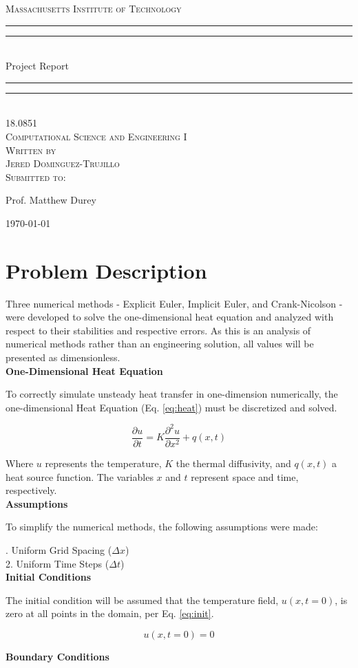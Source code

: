 \documentclass[10pt, letter, showtrims]{extarticle}
\newcommand{\University}{Massachusetts Institute of Technology}
\newcommand{\ClassCode}{18.0851}
\newcommand{\ClassTitle}{Computational Science and Engineering I}
\newcommand{\Title}{Project Report}
\newcommand{\FirstName}{Jered}
\newcommand{\LastName}{Dominguez-Trujillo}
\newcommand{\ProfTitle}{Prof.}
\newcommand{\ProfFirst}{Matthew}
\newcommand{\ProfLast}{Durey}
\newcommand*{\titleGP}{\begingroup %
\centering %

\textsc{\LARGE \University{}} \\[2\baselineskip] %

\rule{\textwidth}{1.6pt}\vspace*{-\baselineskip}\vspace*{2pt} %
\rule{\textwidth}{0.4pt}\\[\baselineskip] %

{\LARGE \Title{}}\\[0.2\baselineskip] %

\rule{\textwidth}{0.4pt}\vspace*{-\baselineskip}\vspace{3.2pt} %
\rule{\textwidth}{1.6pt}\\[\baselineskip] %

\scshape %
{\large \ClassCode{}} \\[0.5\baselineskip]
{\large \ClassTitle{}} \\[4\baselineskip]


Written by \\[0.5\baselineskip]
{\Large \FirstName{} \LastName{}}\\[2\baselineskip] %
Submitted to: \\[0.5\baselineskip]
{\Large \ProfTitle{} \ProfFirst{} \ProfLast{}\par} %
\vspace*{16\baselineskip}
{\large \today}\par 
\vfill %

\endgroup}
\begin{document}
 
	\begin{titlepage}
		\titleGP{}
	\end{titlepage}

	\section{Problem Description}

		\noindent
		Three numerical methods - Explicit Euler, Implicit Euler, and Crank-Nicolson - were developed to solve the one-dimensional heat equation and analyzed with respect to their stabilities and respective errors. As this is an analysis of numerical methods rather than an engineering solution, all values will be presented as dimensionless. \\
		
		\noindent
		\textbf{One-Dimensional Heat Equation}
		
		\noindent
		To correctly simulate unsteady heat transfer in one-dimension numerically, the one-dimensional Heat Equation (Eq. \ref{eq:heat}) must be discretized and solved.
		
		\begin{equation}
			\label{eq:heat}
			\frac{\partial u}{\partial t} = K \frac{\partial^{2} u}{\partial x^{2}} + q(x, t)
		\end{equation}

		\noindent
		Where $u$ represents the temperature, $K$ the thermal diffusivity, and $q(x,t)$ a heat source function. The variables $x$ and $t$ represent space and time, respectively.\\		
		
		\noindent
		\textbf{Assumptions}
	
		\noindent
		To simplify the numerical methods, the following assumptions were made:
		
		. Uniform Grid Spacing ($\Delta x$) \\
		2. Uniform Time Steps   ($\Delta t$) \\	

		\noindent
		\textbf{Initial Conditions}
		
		\noindent
		The initial condition will be assumed that the temperature field, $u(x, t = 0)$, is zero at all points in the domain, per Eq. \ref{eq:init}.
		
		\begin{equation}
		\label{eq:init}
			u(x, t = 0) = 0
		\end{equation}	
	
		\noindent
		\textbf{Boundary Conditions}
\end{document}
